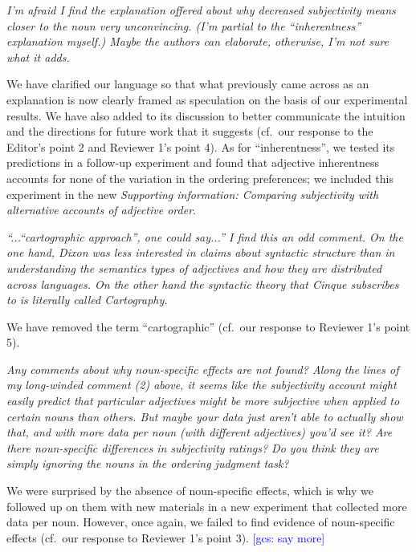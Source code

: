 \documentclass[12pt]{article}
\newcommand{\gcs}[1]{\textcolor{blue}{[gcs: #1]}}
\begin{document}
\item \emph{I'm afraid I find the explanation offered about why decreased subjectivity means closer to the noun very unconvincing. (I'm partial to the ``inherentness'' explanation myself.) Maybe the authors can elaborate, otherwise, I'm not sure what it adds.}

We have clarified our language so that what previously came across as an explanation is now clearly framed as speculation on the basis of our experimental results. We have also added to its discussion to better communicate the intuition and the directions for future work that it suggests (cf.~our response to the Editor's point 2 and Reviewer 1's point 4). As for ``inherentness'', we tested its predictions in a follow-up experiment and found that adjective inherentness accounts for none of the variation in the ordering preferences; we included this experiment in the new \emph{Supporting information: Comparing subjectivity with alternative accounts of adjective order}.

\item \emph{``...``cartographic approach'', one could say...'' I find this an odd comment. On the one hand, Dixon was less interested in claims about syntactic structure than in understanding the semantics types of adjectives and how they are distributed across languages. On the other hand the syntactic theory that Cinque subscribes to is literally called Cartography.}

We have removed the term ``cartographic'' (cf.~our response to Reviewer 1's point 5).

\item \emph{Any comments about why noun-specific effects are not found? Along the lines of my long-winded comment (2) above, it seems like the subjectivity account might easily predict that particular adjectives might be more subjective when applied to certain nouns than others. But maybe your data just aren't able to actually show that, and with more data per noun (with different adjectives) you'd see it? Are there noun-specific differences in subjectivity ratings? Do you think they are simply ignoring the nouns in the ordering judgment task?}

We were surprised by the absence of noun-specific effects, which is why we followed up on them with new materials in a new experiment that collected more data per noun. However, once again, we failed to find evidence of noun-specific effects (cf.~our response to Reviewer 1's point 3). \gcs{say more}
\end{document}
